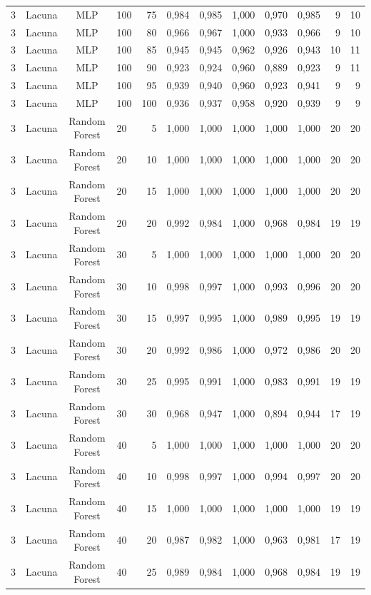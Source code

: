 \begin{longtable}{ccclrrrrrrrr}
3 & Lacuna & MLP & 100 & 75 & 0,984 & 0,985 & 1,000 & 0,970 & 0,985 & 9 & 10 \\
3 & Lacuna & MLP & 100 & 80 & 0,966 & 0,967 & 1,000 & 0,933 & 0,966 & 9 & 10 \\
3 & Lacuna & MLP & 100 & 85 & 0,945 & 0,945 & 0,962 & 0,926 & 0,943 & 10 & 11 \\
3 & Lacuna & MLP & 100 & 90 & 0,923 & 0,924 & 0,960 & 0,889 & 0,923 & 9 & 11 \\
3 & Lacuna & MLP & 100 & 95 & 0,939 & 0,940 & 0,960 & 0,923 & 0,941 & 9 & 9 \\
3 & Lacuna & MLP & 100 & 100 & 0,936 & 0,937 & 0,958 & 0,920 & 0,939 & 9 & 9 \\
3 & Lacuna & Random Forest & 20 & 5 & 1,000 & 1,000 & 1,000 & 1,000 & 1,000 & 20 & 20 \\
3 & Lacuna & Random Forest & 20 & 10 & 1,000 & 1,000 & 1,000 & 1,000 & 1,000 & 20 & 20 \\
3 & Lacuna & Random Forest & 20 & 15 & 1,000 & 1,000 & 1,000 & 1,000 & 1,000 & 20 & 20 \\
3 & Lacuna & Random Forest & 20 & 20 & 0,992 & 0,984 & 1,000 & 0,968 & 0,984 & 19 & 19 \\
3 & Lacuna & Random Forest & 30 & 5 & 1,000 & 1,000 & 1,000 & 1,000 & 1,000 & 20 & 20 \\
3 & Lacuna & Random Forest & 30 & 10 & 0,998 & 0,997 & 1,000 & 0,993 & 0,996 & 20 & 20 \\
3 & Lacuna & Random Forest & 30 & 15 & 0,997 & 0,995 & 1,000 & 0,989 & 0,995 & 19 & 19 \\
3 & Lacuna & Random Forest & 30 & 20 & 0,992 & 0,986 & 1,000 & 0,972 & 0,986 & 20 & 20 \\
3 & Lacuna & Random Forest & 30 & 25 & 0,995 & 0,991 & 1,000 & 0,983 & 0,991 & 19 & 19 \\
3 & Lacuna & Random Forest & 30 & 30 & 0,968 & 0,947 & 1,000 & 0,894 & 0,944 & 17 & 19 \\
3 & Lacuna & Random Forest & 40 & 5 & 1,000 & 1,000 & 1,000 & 1,000 & 1,000 & 20 & 20 \\
3 & Lacuna & Random Forest & 40 & 10 & 0,998 & 0,997 & 1,000 & 0,994 & 0,997 & 20 & 20 \\
3 & Lacuna & Random Forest & 40 & 15 & 1,000 & 1,000 & 1,000 & 1,000 & 1,000 & 19 & 19 \\
3 & Lacuna & Random Forest & 40 & 20 & 0,987 & 0,982 & 1,000 & 0,963 & 0,981 & 17 & 19 \\
3 & Lacuna & Random Forest & 40 & 25 & 0,989 & 0,984 & 1,000 & 0,968 & 0,984 & 19 & 19 \\

\end{longtable}
